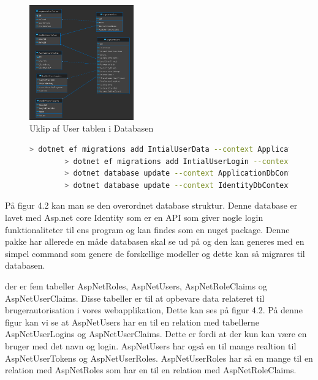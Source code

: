 \begin{figure} 
    \centering
    \includegraphics[width=0.4\textwidth]{./Pictures/database-diagram.png}
    \caption{Uklip af User tablen i Databasen}
    \label{fig:databaseUserTable}
\end{figure}

\begin{figure}[!h]
    \begin{lstlisting}[language=bash]
        > dotnet ef migrations add IntialUserData --context ApplicationDbContext
        > dotnet ef migrations add IntialUserLogin --context IdentityDbContext
        > dotnet database update --context ApplicationDbContext
        > dotnet database update --context IdentityDbContext
    \end{lstlisting}
\end{figure}

På figur 4.2 kan man se den overordnet database struktur. Denne database er lavet med
Asp.net core Identity som er en API som giver nogle login funktionaliteter til ens program
og kan findes som en nuget package. Denne pakke har allerede en måde databasen skal se ud på og 
den kan generes med en simpel command som genere de forskellige modeller og dette kan så migrares til databasen.  


der er fem tabeller AspNetRoles, AspNetUsers, AspNetRoleClaims og AspNetUserClaims. 
Disse tabeller er til at opbevare data relateret til brugerautorisation i vores webapplikation, Dette kan ses på figur 4.2. På denne figur 
kan vi se at AspNetUsers har en til en relation med tabellerne AspNetUserLogins og AspNetUserClaims. Dette er fordi at der kun kan være en bruger
med det navn og login. AspNetUsers har også en til mange realtion til AspNetUserTokens og AspNetUserRoles. AspNetUserRoles har så en mange til en relation med
AspNetRoles som  har en til en relation med AspNetRoleClaims.






